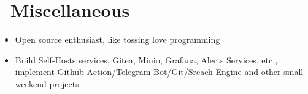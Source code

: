 \documentclass{resume}
\newcommand{\en}[1]{#1}
\newcommand{\zh}[1]{}
\begin{document}
\section{\faInfo\ \en{Miscellaneous}\zh{杂项}}
\begin{itemize}[parsep=0.5ex]
      \item \en{Open source enthusiast, like tossing love programming}
            \zh{开源爱好者,喜欢折腾热爱编程}
      \item \en{Build Self-Hosts services, Gitea, Minio, Grafana, Alerts Services, etc., implement Github Action/Telegram Bot/Git/Sreach-Engine and other small weekend projects}
            \zh{搭建 Self-Hosts 服务,Gitea、Minio、Grafana、Alerts Services 等,实现 Github Action/Telegram Bot/Git/Sreach-Engine 等周末小项目}
\end{itemize}
\end{document}
